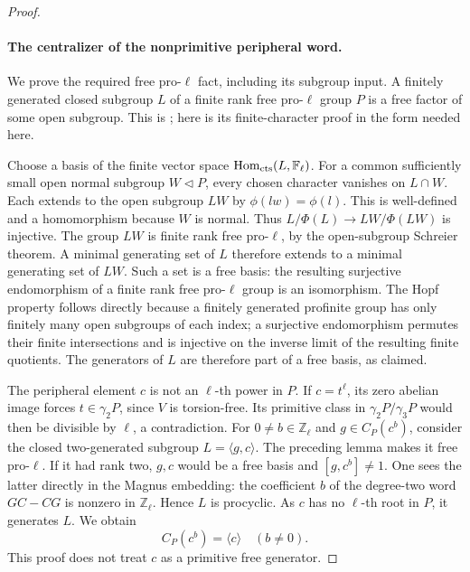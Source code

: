 \begin{proof}
\paragraph{The centralizer of the nonprimitive peripheral word.}
We prove the required free pro-\(\ell\) fact,
including its subgroup input. A finitely
generated closed subgroup \(L\) of a finite
rank free pro-\(\ell\) group \(P\) is a
free factor of some open subgroup. This
is \cite[Theorem 3.2, pp.~317--318]{DE_Lubotzky1982};
here is its finite-character proof in the
form needed here.

Choose a basis of the finite vector space
\(\operatorname{Hom}_{\rm cts}(L,\mathbb F_\ell)\).
For a common sufficiently small open normal
subgroup \(W\lhd P\), every chosen character
vanishes on \(L\cap W\). Each extends to
the open subgroup \(LW\) by
\(\phi(lw)=\phi(l)\). This is well-defined
and a homomorphism because \(W\) is normal.
Thus \(L/\Phi(L)\to LW/\Phi(LW)\) is injective.
The group \(LW\) is finite rank free pro-\(\ell\),
by the open-subgroup Schreier theorem.
A minimal generating set of \(L\) therefore
extends to a minimal generating set of \(LW\).
Such a set is a free basis: the resulting
surjective endomorphism of a finite rank free
pro-\(\ell\) group is an isomorphism. The
Hopf property follows directly because a
finitely generated profinite group has only
finitely many open subgroups of each index;
a surjective endomorphism permutes their
finite intersections and is injective on
the inverse limit of the resulting finite
quotients. The generators of \(L\) are
therefore part of a free basis, as claimed.

The peripheral element \(c\) is not an
\(\ell\)-th power in \(P\). If \(c=t^\ell\),
its zero abelian image forces \(t\in\gamma_2P\),
since \(V\) is torsion-free. Its primitive
class in \(\gamma_2P/\gamma_3P\) would then
be divisible by \(\ell\), a contradiction.
For \(0\ne b\in\mathbb Z_\ell\) and
\(g\in C_P(c^b)\), consider the closed
two-generated subgroup \(L=\langle g,c\rangle\).
The preceding lemma makes it free pro-\(\ell\).
If it had rank two, \(g,c\) would be a
free basis and \([g,c^b]\ne1\). One sees
the latter directly in the Magnus embedding:
the coefficient \(b\) of the degree-two
word \(GC-CG\) is nonzero in
\(\mathbb Z_\ell\). Hence \(L\) is procyclic.
As \(c\) has no \(\ell\)-th root in \(P\),
it generates \(L\). We obtain
\[
                   C_P(c^b)=\langle c\rangle
                         \quad(b\ne0).                 \tag{D.71.8}
\]
This proof does not treat \(c\) as a primitive
free generator.


\end{proof}
